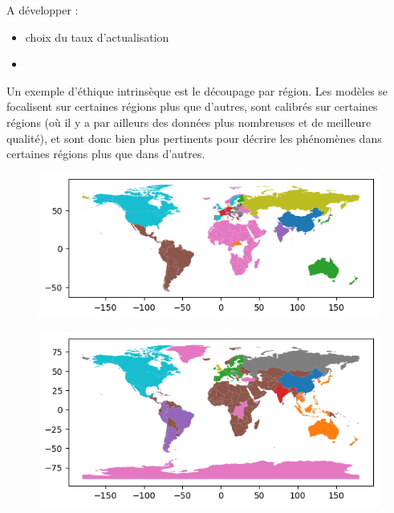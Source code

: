 \begin{tcolorbox}
    A développer : 
    \begin{itemize}
        \item choix du taux d'actualisation
        \item 
    \end{itemize}
\end{tcolorbox}

Un exemple d'éthique intrinsèque est le découpage par région. Les modèles se focalisent sur certaines régions plus que d'autres, sont calibrés sur certaines régions (où il y a par ailleurs des données plus nombreuses et de meilleure qualité), et sont donc bien plus pertinents pour décrire les phénomènes dans certaines régions plus que dans d'autres. 

\begin{figure}[htbp]
    \centering
    \begin{minipage}{0.45\textwidth}
        \centering
        \includegraphics[width=\linewidth]{figures/FUND_regions.png} %
        \label{fig:carte1}
    \end{minipage}%
    \hfill
    \begin{minipage}{0.45\textwidth}
        \centering
        \includegraphics[width=\linewidth]{figures/WILIAM_regions.png} %
        \label{fig:carte2}
    \end{minipage}%
    \label{fig:trois_cartes}
\end{figure}

